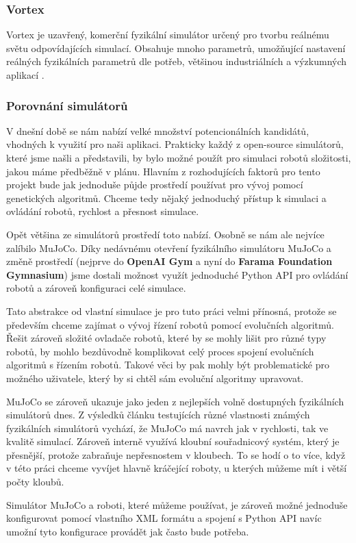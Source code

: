 \subsubsection{Vortex} \label{Vortex}
Vortex je uzavřený, komerční fyzikální simulátor určený pro tvorbu
reálnému světu odpovídajících simulací. Obsahuje mnoho parametrů,
umožňující nastavení reálných fyzikálních parametrů dle potřeb,
většinou industriálních a výzkumných aplikací \citep{coppeliarobotics}
\citep{yoon2023comparative}.

\subsubsection{Porovnání simulátorů} \label{Simulátory - Porovnání}
V dnešní době se nám nabízí velké množství potencionálních kandidátů, vhodných
k využití pro naši aplikaci. Prakticky každý z open-source simulátorů, které
jsme našli a představili, by bylo možné použít pro simulaci robotů složitosti,
jakou máme předběžně v plánu. Hlavním z rozhodujících faktorů pro tento projekt
bude jak jednoduše půjde prostředí používat pro vývoj pomocí genetických
algoritmů. Chceme tedy nějaký jednoduchý přístup k simulaci a ovládání robotů,
rychlost a přesnost simulace. 

Opět většina ze simulátorů prostředí toto nabízí. Osobně se nám ale nejvíce
zalíbilo MuJoCo. Díky nedávnému otevření fyzikálního simulátoru MuJoCo a změně
prostředí (nejprve do \textbf{OpenAI Gym} a nyní do \textbf{Farama Foundation
Gymnasium}) jsme dostali možnost využít jednoduché Python API pro ovládání
robotů a zároveň konfiguraci celé simulace. 

Tato abstrakce od vlastní simulace je pro tuto práci velmi přínosná, protože se
především chceme zajímat o vývoj řízení robotů pomocí evolučních algoritmů.
Řešit zároveň složité ovladače robotů, které by se mohly lišit pro různé typy
robotů, by mohlo bezdůvodně komplikovat celý proces spojení evolučních
algoritmů s řízením robotů. Takové věci by pak mohly být problematické pro
možného uživatele, který by si chtěl sám evoluční algoritmy upravovat.

MuJoCo se zároveň ukazuje jako jeden z nejlepších volně dostupných fyzikálních
simulátorů dnes. Z výsledků článku testujících různé vlastnosti známých fyzikálních
simulátorů \citet{erez2015simulation} vychází, že MuJoCo má navrch jak v
rychlosti, tak ve kvalitě simulací. Zároveň interně využívá kloubní
souřadnicový systém, který je přesnější, protože zabraňuje nepřesnostem v
kloubech. To se hodí o to více, když v této práci chceme vyvíjet hlavně
kráčející roboty, u kterých můžeme mít i větší počty kloubů. 

Simulátor MuJoCo a roboti, které můžeme používat, je zároveň možné
jednoduše konfigurovat pomocí vlastního XML formátu a spojení s Python API
navíc umožní tyto konfigurace provádět jak často bude potřeba.
